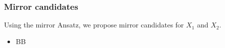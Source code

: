 \begin{frame}
\frametitle{Mirror candidates}

Using the mirror Ansatz, we propose mirror candidates for $X_1$ and $X_2$.

\begin{itemize}
	\item BB
\end{itemize}


\end{frame}